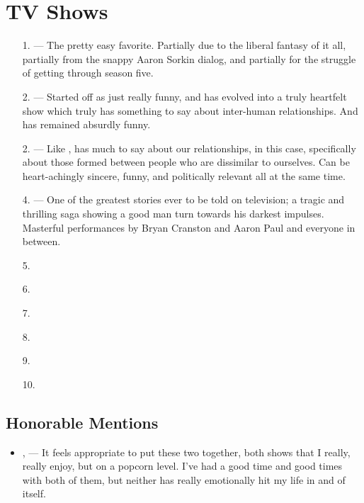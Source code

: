 \documentclass[../butidigress.tex]{subfiles}
\begin{document}
\section{TV Shows}\label{sec:tvshowstopten}
\begin{itemize}
    \item[1.] \textbf{} --- The pretty easy favorite. Partially due to the liberal fantasy of it all, partially from the snappy Aaron Sorkin dialog, and partially for the struggle of getting through season five.
    \item[2.] \textbf{} --- Started off as just really funny, and has evolved into a truly heartfelt show which truly has something to say about inter-human relationships. And has remained absurdly funny.
    \item[2.] \textbf{} --- Like ,  has much to say about our relationships, in this case, specifically about those formed between people who are dissimilar to ourselves. Can be heart-achingly sincere, funny, and politically relevant all at the same time.
    \item[4.] \textbf{} --- One of the greatest stories ever to be told on television; a tragic and thrilling saga showing a good man turn towards his darkest impulses. Masterful performances by Bryan Cranston and Aaron Paul and everyone in between.
    \item[5.] \textbf{}
    \item[6.] \textbf{}
    \item[7.] \textbf{}
    \item[8.] \textbf{}
    \item[9.] \textbf{}
    \item[10.] \textbf{}
\end{itemize}
\subsection{Honorable Mentions}
\begin{itemize}
    \item \textbf{}, \textbf{} --- It feels appropriate to put these two together, both shows that I really, really enjoy, but on a popcorn level. I've had a good time and good times with both of them, but neither has really emotionally hit my life in and of itself.
\end{itemize}
\end{document}
